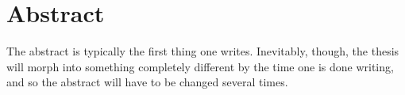 \chapter{Abstract}

The abstract is typically the first thing one writes. Inevitably, though, the thesis will morph into something completely different by the time one is done writing, and so the abstract will have to be changed several times. 